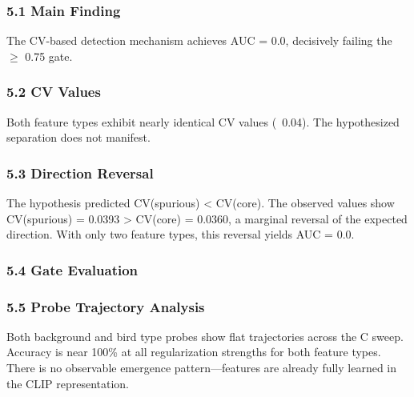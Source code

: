 
\subsubsection{5.1 Main Finding}

The CV-based detection mechanism achieves AUC = 0.0, decisively failing the $\geq$ 0.75 gate.

\subsubsection{5.2 CV Values}

\begin{table}[htbp]
\centering
{}
\end{table}

Both feature types exhibit nearly identical CV values (~0.04). The hypothesized separation does not manifest.

\subsubsection{5.3 Direction Reversal}

The hypothesis predicted CV(spurious) < CV(core). The observed values show CV(spurious) = 0.0393 > CV(core) = 0.0360, a marginal reversal of the expected direction. With only two feature types, this reversal yields AUC = 0.0.

\subsubsection{5.4 Gate Evaluation}

\begin{table}[htbp]
\centering
{}
\end{table}

\subsubsection{5.5 Probe Trajectory Analysis}

Both background and bird type probes show flat trajectories across the C sweep. Accuracy is near 100\% at all regularization strengths for both feature types. There is no observable emergence pattern---features are already fully learned in the CLIP representation.

